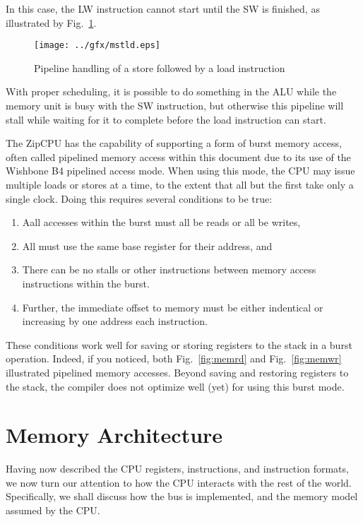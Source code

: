 \documentclass{gqtekspec}
\begin{document}
\begin{itemize}
In this case, the LW instruction cannot start until the SW is finished,
as illustrated by Fig.~\ref{fig:mstld}.
\begin{figure}\begin{center}
\texttt{[image: ../gfx/mstld.eps]}
\caption{Pipeline handling of a store followed by a load instruction}\label{fig:mstld}
\end{center}\end{figure}
With proper scheduling, it is possible to do something in the ALU while the
memory unit is busy with the SW instruction, but otherwise this pipeline will
stall while waiting for it to complete before the load instruction can
start.

The ZipCPU has the capability of supporting a form of burst memory access,
often called pipelined memory access within this document due to its use of
the Wishbone B4 pipelined access mode.
When using this mode, the CPU may issue multiple loads or stores at a time,
to the extent that all but the first take only a single clock.  Doing this
requires several conditions to be true:
\begin{enumerate}
\item Aall accesses within the burst must all be reads or all be writes,
\item All must use the same base register for their address, and
\item There can be no stalls or other instructions between memory access instructions within the burst. 
\item Further, the immediate offset to memory must be either indentical or
	increasing by one address each instruction. 
\end{enumerate}
These conditions work well for saving or storing registers to the stack in a 
burst operation.  Indeed, if you noticed, both Fig.~\ref{fig:memrd} and
Fig.~\ref{fig:memwr} illustrated pipelined memory accesses.  Beyond saving and
restoring registers to the stack, the compiler does not optimize well (yet)
for using this burst mode.

\end{itemize}

\section{Memory Architecture}
Having now described the CPU registers, instructions, and instruction formats,
we now turn our attention to how the CPU interacts with the rest of the world.
Specifically, we shall discuss how the bus is implemented, and the memory
model assumed by the CPU.
\end{document}

